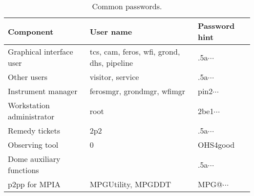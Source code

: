 \documentclass[11pt,fleqn]{book}
\begin{document}
\begin{table}
\caption{Common passwords.}
\centering
\begin{tabular}{lll}
\hline
Component                 &  User name                                            & Password hint\\
\hline\hline
Graphical interface user  & tcs, cam, feros, wfi, grond, dhs, pipeline & .5a$\cdots$\\
Other users               & visitor, service                           & .5a$\cdots$\\
Instrument manager        & ferosmgr, grondmgr, wfimgr                            & pin2$\cdots$\\
Workstation administrator & root                                                  & 2be1$\cdots$\\
Remedy tickets            & 2p2                                                   & .5a$\cdots$\\
Observing tool            & 0                                                     & OHS4good\\
Dome auxiliary functions  &                                                       & .5a$\cdots$\\
p2pp for MPIA             & MPGUtility, MPGDDT                                    & MPG@$\cdots$\\
\hline
\end{tabular}
\end{table}
\end{document}
